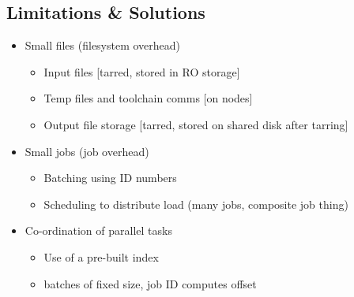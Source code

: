 \subsection{Limitations \& Solutions}
\begin{itemize}
    \item Small files (filesystem overhead)
        \begin{itemize}
            \item Input files [tarred, stored in RO storage]
            \item Temp files and toolchain comms [on nodes]
            \item Output file storage [tarred, stored on shared disk after tarring]
        \end{itemize}
    \item Small jobs (job overhead)
        \begin{itemize}
            \item Batching using ID numbers
            \item Scheduling to distribute load (many jobs, composite job thing)
        \end{itemize}
    \item Co-ordination of parallel tasks
        \begin{itemize}
            \item Use of a pre-built index
            \item batches of fixed size, job ID computes offset
        \end{itemize}
\end{itemize}



